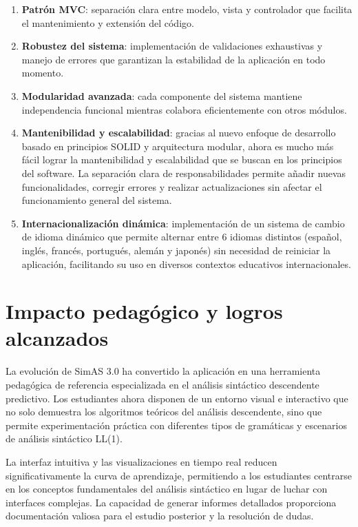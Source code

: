 \begin{enumerate}
    \item \textbf{Patrón MVC}: separación clara entre modelo, vista y controlador que facilita el mantenimiento y extensión del código.

    \item \textbf{Robustez del sistema}: implementación de validaciones exhaustivas y manejo de errores que garantizan la estabilidad de la aplicación en todo momento.

    \item \textbf{Modularidad avanzada}: cada componente del sistema mantiene independencia funcional mientras colabora eficientemente con otros módulos.

    \item \textbf{Mantenibilidad y escalabilidad}: gracias al nuevo enfoque de desarrollo basado en principios SOLID \cite{solid-principles} y arquitectura modular, ahora es mucho más fácil lograr la mantenibilidad y escalabilidad que se buscan en los principios del software. La separación clara de responsabilidades permite añadir nuevas funcionalidades, corregir errores y realizar actualizaciones sin afectar el funcionamiento general del sistema.

    \item \textbf{Internacionalización dinámica}: implementación de un sistema de cambio de idioma dinámico que permite alternar entre 6 idiomas distintos (español, inglés, francés, portugués, alemán y japonés) sin necesidad de reiniciar la aplicación, facilitando su uso en diversos contextos educativos internacionales.
\end{enumerate}

\section{Impacto pedagógico y logros alcanzados}

La evolución de SimAS 3.0 ha convertido la aplicación en una herramienta pedagógica de referencia especializada en el análisis sintáctico descendente predictivo. Los estudiantes ahora disponen de un entorno visual e interactivo que no solo demuestra los algoritmos teóricos del análisis descendente, sino que permite experimentación práctica con diferentes tipos de gramáticas y escenarios de análisis sintáctico LL(1).

La interfaz intuitiva y las visualizaciones en tiempo real reducen significativamente la curva de aprendizaje, permitiendo a los estudiantes centrarse en los conceptos fundamentales del análisis sintáctico en lugar de luchar con interfaces complejas. La capacidad de generar informes detallados proporciona documentación valiosa para el estudio posterior y la resolución de dudas.


